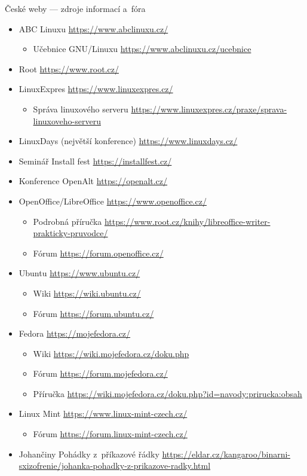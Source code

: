 \documentclass[compress, ucs, xelatex, 11pt, xcolor=svgnames, aspectratio=169,
	hyperref={
		bookmarks=true,
		unicode=true,
		colorlinks=true,
		pdftitle={Linux, command line and MetaCentrum},
		plainpages=false,
		pdfauthor={Vojtech Zeisek},
		pdfsubject={Course about use of Linux command line, writing shell scripts and using MetaCentrum of CESNET},
		pdfcreator={XeLaTeX},
		pdfkeywords={Linux, GNU, BASH, shell, command line, MetaCentrum},
		linkcolor=DarkRed, %
		anchorcolor=DarkBlue, %
		citecolor=Indigo, %
		filecolor=NavyBlue, %
		menucolor=DarkMagenta, %
		urlcolor=DarkBlue, %
		pdftex},
	url={hyphens, lowtilde} %
	]{beamer}
\begin{document}
\begin{frame}[allowframebreaks]{České weby --- zdroje informací a~fóra}
	\begin{itemize}
		\item ABC Linuxu \url{https://www.abclinuxu.cz/}
		\begin{itemize}
			\item Učebnice GNU/Linuxu \url{https://www.abclinuxu.cz/ucebnice}
		\end{itemize}
		\item Root \url{https://www.root.cz/}
		\item LinuxExpres \url{https://www.linuxexpres.cz/}
		\begin{itemize}
			\item Správa linuxového serveru \url{https://www.linuxexpres.cz/praxe/sprava-linuxoveho-serveru}
		\end{itemize}
		\item LinuxDays (největší konference) \url{https://www.linuxdays.cz/}
		\item Seminář Install fest \url{https://installfest.cz/}
		\item Konference OpenAlt \url{https://openalt.cz/}
		\item OpenOffice/LibreOffice \url{https://www.openoffice.cz/}
		\begin{itemize}
			\item Podrobná příručka \url{https://www.root.cz/knihy/libreoffice-writer-prakticky-pruvodce/}
			\item Fórum \url{https://forum.openoffice.cz/}
		\end{itemize}
		\item Ubuntu \url{https://www.ubuntu.cz/}
		\begin{itemize}
			\item Wiki \url{https://wiki.ubuntu.cz/}
			\item Fórum \url{https://forum.ubuntu.cz/}
		\end{itemize}
		\item Fedora \url{https://mojefedora.cz/}
		\begin{itemize}
			\item Wiki \url{https://wiki.mojefedora.cz/doku.php}
			\item Fórum \url{https://forum.mojefedora.cz/}
			\item Příručka \url{https://wiki.mojefedora.cz/doku.php?id=navody:prirucka:obsah}
		\end{itemize}
		\item Linux Mint \url{https://www.linux-mint-czech.cz/}
		\begin{itemize}
			\item Fórum \url{https://forum.linux-mint-czech.cz/}
		\end{itemize}
		\item Johančiny Pohádky z~příkazové řádky \url{https://eldar.cz/kangaroo/binarni-sxizofrenie/johanka-pohadky-z-prikazove-radky.html}
	\end{itemize}
\end{frame}
\end{document}
